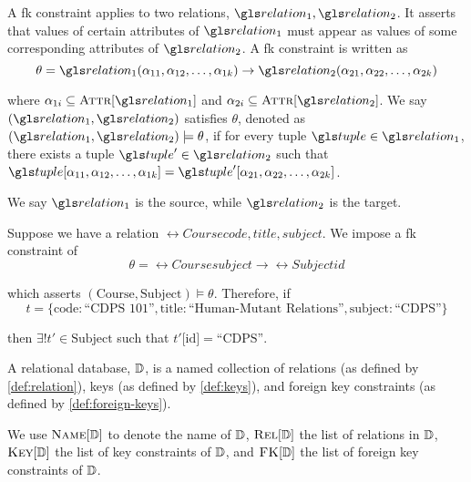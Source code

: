 	\begin{defn}
	\label{def:foreign-keys}
		A \gls{fk} constraint applies to two relations, \(\relation_1, \relation_2\).  It asserts that values of certain attributes of \(\relation_1\) must appear as values of some corresponding attributes of \(\relation_2\).  A \gls{fk} constraint is written as
		\[
			\theta = \relation_1(\attribute_{11}, \attribute_{12}, \dotsc, \attribute_{1k}) \rightarrow \relation_2(\attribute_{21}, \attribute_{22}, \dotsc, \attribute_{2k})
		\]
		
		where \(\attribute_{1i} \subseteq \attributes{\relation_1}\) and \(\attribute_{2i} \subseteq \attributes{\relation_2}\).  We say \((\relation_1, \relation_2)\) satisfies \(\theta\), denoted as \((\relation_1, \relation_2) \models \theta\), if for every tuple \(\tuple \in \relation_1\), there exists a tuple \(\tuple' \in \relation_2\) such that \(\tuple\lbrack\attribute_{11}, \attribute_{12}, \dotsc, \attribute_{1k}\rbrack = \tuple'\lbrack\attribute_{21}, \attribute_{22}, \dotsc, \attribute_{2k}\rbrack\).
		
		We say \(\relation_1\) is the source, while \(\relation_2\) is the target.
				
		\begin{ex}
			Suppose we have a relation \(\rel{Course}{code, title, subject}\).	 We impose a \gls{fk} constraint of
			\begin{equation}
				\theta = \rel{Course}{subject} \rightarrow \rel{Subject}{id}
			\end{equation}
			
			which asserts \((\text{Course}, \text{Subject}) \models \theta\).  Therefore, if
			\[
				t = \{\text{code}: \text{``CDPS 101''}, \text{title}: \text{``Human-Mutant Relations''}, \text{subject}: \text{``CDPS''}\}
			\]
			
			then \(\exists! t' \in \text{Subject}\) such that \(t'\lbrack\text{id}\rbrack = \text{``CDPS''}\).
		\end{ex}
	\end{defn}
	
	\begin{defn}
	\label{def:relational-database}
		A relational database, \(\mathbb{D}\), is a named collection of relations (as defined by \vref{def:relation}), keys (as defined by \vref{def:keys}), and foreign key constraints (as defined by \vref{def:foreign-keys}).
		
		We use \(\textsc{Name}[\mathbb{D}]\) to denote the name of \(\mathbb{D}\), \(\textsc{Rel}[\mathbb{D}]\) the list of relations in \(\mathbb{D}\), \(\textsc{Key}[\mathbb{D}]\) the list of key constraints of \(\mathbb{D}\), and \(\textsc{FK}[\mathbb{D}]\) the list of foreign key constraints of \(\mathbb{D}\).
	\end{defn}
	
